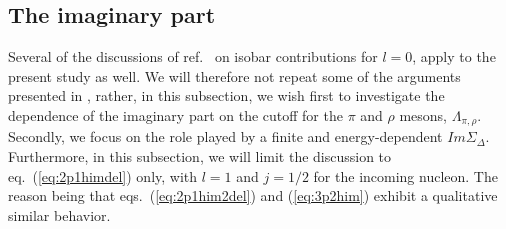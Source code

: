 \subsection{The imaginary part}
Several of the discussions of ref.\ \cite{hbmp93} on isobar contributions
for $l=0$, apply to the present study as well.
We will therefore 
not repeat some of the arguments presented in \cite{hbmp93}, rather, 
in this subsection, 
we wish first to
investigate the dependence of the imaginary part
on the cutoff for the $\pi$ and $\rho$ mesons, $\Lambda_{\pi ,\rho}$.
Secondly, we focus on the role played by a finite and energy-dependent
$Im\Sigma_{\Delta}$. Furthermore, in this subsection, 
we will limit the discussion to
eq.\ (\ref{eq:2p1himdel}) only, with $l=1$ and $j=1/2$ for the incoming
nucleon. The reason being that eqs.\ (\ref{eq:2p1him2del}) and 
(\ref{eq:3p2him}) exhibit a qualitative similar behavior.

